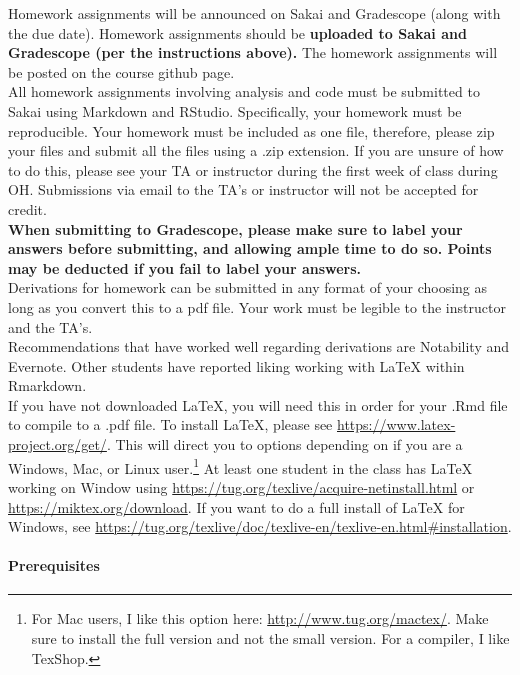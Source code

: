 \documentclass[11pt]{article}
\begin{document}
Homework assignments will be announced on Sakai and Gradescope (along with the due date). Homework assignments should be \textbf{uploaded to Sakai and Gradescope (per the instructions above).} The homework assignments will be posted on the course github page. \\

All homework assignments involving analysis and code must be submitted to Sakai using Markdown and RStudio. Specifically, your homework must be reproducible. Your homework must be included as one file, therefore, please zip your files and submit all the files using a .zip extension. If you are unsure of how to do this, please see your TA or instructor during the first week of class during OH. Submissions via email to the TA's or instructor will not be accepted for credit. \\

\textbf{When submitting to Gradescope, please make sure to label your answers before submitting, and allowing ample time to do so. Points may be deducted if you fail to label your answers.}\\

Derivations for homework can be submitted in any format of your choosing as long as you convert this to a pdf file. Your work must be legible to the instructor and the TA's. \\

Recommendations that have worked well regarding derivations are Notability and Evernote. Other students have reported liking working with LaTeX within Rmarkdown. \\

If you have not downloaded LaTeX, you will need this in order for your .Rmd file to compile to a .pdf file. To install LaTeX, please see \url{https://www.latex-project.org/get/}. This will direct you to options depending on if you are a Windows, Mac, or Linux user.\footnote{For Mac users, I like this option here: \url{http://www.tug.org/mactex/}. Make sure to install the full version and not the small version. For a compiler, I like TexShop.}  At least one student in the class has LaTeX working on Window using \url{https://tug.org/texlive/acquire-netinstall.html} or \url{https://miktex.org/download}. If you want to do a full install of LaTeX for Windows, see \url{https://tug.org/texlive/doc/texlive-en/texlive-en.html#installation}.


\paragraph{Prerequisites}
\end{document}
